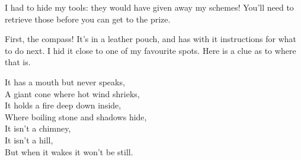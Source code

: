 \documentclass[a5paper, 12pt]{article}
\begin{document}

I had to hide my tools: they would have given away my schemes!
You'll need to retrieve those before you can get to the prize.

First, the compass! 
It's in a leather pouch, and has with it instructions for what to do next.
I hid it close to one of my favourite spots.
Here is a clue as to where that is.

\begin{riddle}
It has a mouth but never speaks,\\
A giant cone where hot wind shrieks,\\
It holds a fire deep down inside,\\
Where boiling stone and shadows hide,\\
It isn't a chimney,\\
It isn't a hill,\\
But when it wakes it won't be still.
\end{riddle}

\end{document}
